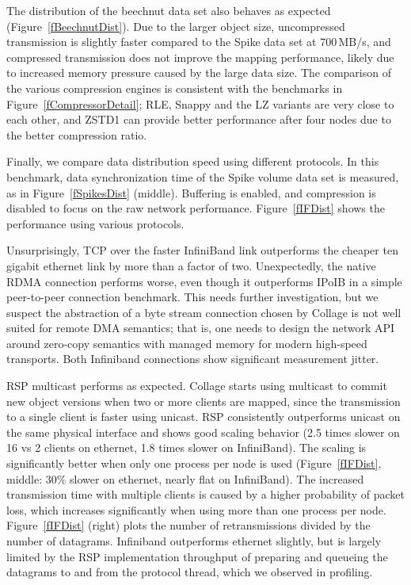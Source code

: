 \documentclass[10pt,journal,compsoc]{IEEEtran}
\newcommand{\fig}[1]{Figure~\ref{#1}}
\begin{document}
The distribution of the beechnut data set also behaves as expected
(\fig{fBeechnutDist}). Due to the larger object size, uncompressed transmission
is slightly faster compared to the Spike data set at 700\,MB/s, and compressed
transmission does not improve the mapping performance, likely due to increased
memory pressure caused by the large data size. The comparison of the various
compression engines is consistent with the benchmarks in
\fig{fCompressorDetail}; RLE, Snappy and the LZ variants are very close to each
other, and ZSTD1 can provide better performance after four nodes due to the
better compression ratio.

Finally, we compare data distribution speed using different protocols. In this
benchmark, data synchronization time of the Spike volume data set is measured,
as in \fig{fSpikesDist} (middle). Buffering is enabled, and compression is
disabled to focus on the raw network performance. \fig{fIFDist} shows the
performance using various protocols.

Unsurprisingly, TCP over the faster InfiniBand link outperforms the cheaper ten
gigabit ethernet link by more than a factor of two. Unexpectedly, the native
RDMA connection performs worse, even though it outperforms IPoIB in a simple
peer-to-peer connection benchmark. This needs further investigation, but we
suspect the abstraction of a byte stream connection chosen by \textsf{Collage}
is not well suited for remote DMA semantics; that is, one needs to design the
network API around zero-copy semantics with managed memory for modern high-speed
transports. Both Infiniband connections show significant measurement jitter.

RSP multicast performs as expected. \textsf{Collage} starts using multicast to
commit new object versions when two or more clients are mapped, since the
transmission to a single client is faster using unicast. RSP consistently
outperforms unicast on the same physical interface and shows good scaling
behavior (2.5 times slower on 16 vs 2 clients on ethernet, 1.8 times slower on
InfiniBand). The scaling is significantly better when only one process per node
is used (\fig{fIFDist}, middle: 30\% slower on ethernet, nearly flat on
InfiniBand). The increased transmission time with multiple clients is caused by
a higher probability of packet loss, which increases significantly when using
more than one process per node. \fig{fIFDist} (right) plots the number of
retransmissions divided by the number of datagrams. Infiniband outperforms
ethernet slightly, but is largely limited by the RSP implementation throughput
of preparing and queueing the datagrams to and from the protocol thread, which
we observed in profiling.
\end{document}
